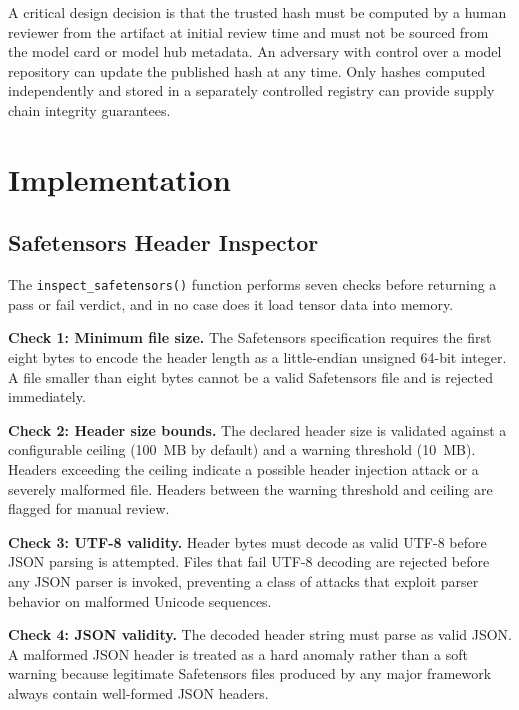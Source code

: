 \documentclass[sigconf,review]{acmart}
\begin{document}
A critical design decision is that the trusted hash must be computed by a
human reviewer from the artifact at initial review time and must not be
sourced from the model card or model hub metadata. An adversary with control
over a model repository can update the published hash at any time. Only
hashes computed independently and stored in a separately controlled registry
can provide supply chain integrity guarantees.

\section{Implementation}
\label{sec:impl}

\subsection{Safetensors Header Inspector}

The \texttt{inspect\_safetensors()} function performs seven checks before
returning a pass or fail verdict, and in no case does it load tensor data
into memory.

\textbf{Check 1: Minimum file size.} The Safetensors specification requires
the first eight bytes to encode the header length as a little-endian
unsigned 64-bit integer. A file smaller than eight bytes cannot be a valid
Safetensors file and is rejected immediately.

\textbf{Check 2: Header size bounds.} The declared header size is validated
against a configurable ceiling (100~MB by default) and a warning threshold
(10~MB). Headers exceeding the ceiling indicate a possible header injection
attack or a severely malformed file. Headers between the warning threshold
and ceiling are flagged for manual review.

\textbf{Check 3: UTF-8 validity.} Header bytes must decode as valid UTF-8
before JSON parsing is attempted. Files that fail UTF-8 decoding are rejected
before any JSON parser is invoked, preventing a class of attacks that exploit
parser behavior on malformed Unicode sequences.

\textbf{Check 4: JSON validity.} The decoded header string must parse as
valid JSON. A malformed JSON header is treated as a hard anomaly rather than
a soft warning because legitimate Safetensors files produced by any major
framework always contain well-formed JSON headers.
\end{document}
